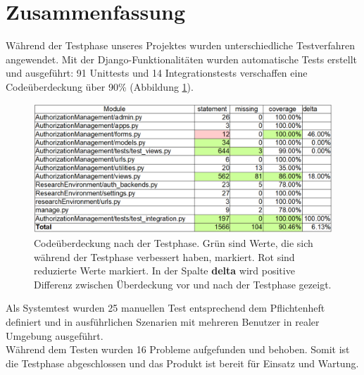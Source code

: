 \documentclass[parskip=full,11pt]{scrartcl}
\begin{document}
\begin{itemize}
\end{itemize}   

\newpage
\section{Zusammenfassung} \label{zusammenfassung}
Während der Testphase unseres Projektes wurden unterschiedliche Testverfahren angewendet. Mit der Django-Funktionalitäten wurden automatische Tests erstellt und ausgeführt: 91 Unittests und 14 Integrationstests verschaffen eine Codeüberdeckung über 90\% (Abbildung \ref{coverage}). \\

 \begin{figure}[ht!]
 	\centering
 	\includegraphics[width=1\textwidth]{res/coverage_after.PNG}
 	\caption{Codeüberdeckung nach der Testphase. Grün sind Werte, die sich während der Testphase verbessert haben, markiert. Rot sind reduzierte Werte markiert. In der Spalte \textbf{delta} wird positive Differenz zwischen Überdeckung vor und nach der Testphase gezeigt.}
\label{coverage}
 \end{figure}
 Als Systemtest wurden 25 manuellen Test entsprechend dem Pflichtenheft definiert und in ausführlichen Szenarien mit mehreren Benutzer in realer Umgebung ausgeführt.\\
Während dem Testen wurden 16 Probleme aufgefunden und behoben. Somit ist die Testphase abgeschlossen und das Produkt ist bereit für Einsatz und Wartung. 
\end{document}
